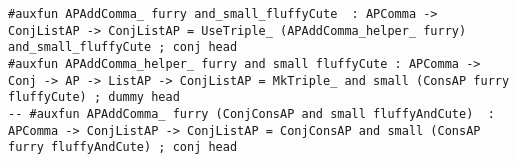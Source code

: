 \begin{lstlisting}
#auxfun APAddComma_ furry and_small_fluffyCute  : APComma -> ConjListAP -> ConjListAP = UseTriple_ (APAddComma_helper_ furry) and_small_fluffyCute ; conj head
#auxfun APAddComma_helper_ furry and small fluffyCute : APComma -> Conj -> AP -> ListAP -> ConjListAP = MkTriple_ and small (ConsAP furry fluffyCute) ; dummy head
-- #auxfun APAddComma_ furry (ConjConsAP and small fluffyAndCute)  : APComma -> ConjListAP -> ConjListAP = ConjConsAP and small (ConsAP furry fluffyAndCute) ; conj head

\end{lstlisting}
